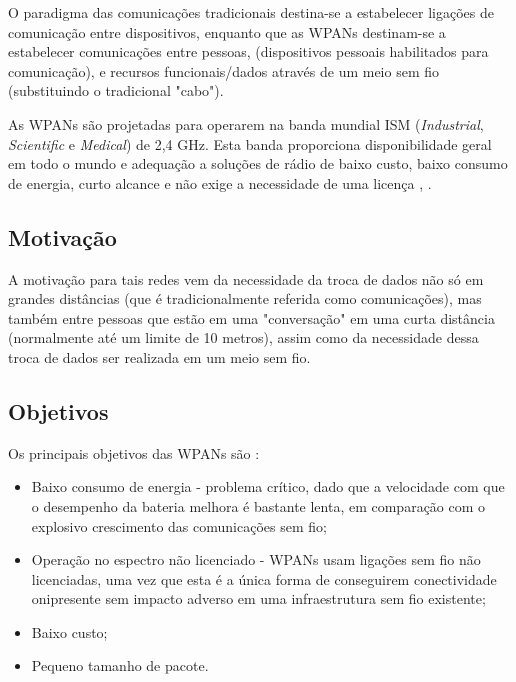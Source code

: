 \documentclass[conference]{IEEEtran}
\begin{document}
O paradigma das comunicações tradicionais destina-se a estabelecer ligações de comunicação entre dispositivos, enquanto que as WPANs destinam-se a estabelecer comunicações entre pessoas, (dispositivos pessoais habilitados para comunicação), e recursos funcionais/dados através de um meio sem fio (substituindo o tradicional "cabo").

As WPANs são projetadas para operarem na banda mundial ISM (\textit{Industrial}, \textit{Scientific} e \textit{Medical}) de 2,4 GHz. Esta banda proporciona disponibilidade geral em todo o mundo e adequação a soluções de rádio de baixo custo, baixo consumo de energia, curto alcance e não exige a necessidade de uma licença \cite{marsan2002optimizing}, \cite{braley2000wireless}.


\subsection{Motivação}

A motivação para tais redes vem da necessidade da troca de dados não só em grandes distâncias (que é tradicionalmente referida como comunicações), mas também entre pessoas que estão em uma "conversação" em uma curta distância (normalmente até um limite de 10 metros), assim como da necessidade dessa troca de dados ser realizada em um meio sem fio.


\subsection{Objetivos}

Os principais objetivos das WPANs são \cite{prasad2004ofdm}:

\begin{itemize}

 \item Baixo consumo de energia - problema crítico, dado que a velocidade com que o desempenho da bateria melhora é bastante lenta, em comparação com o explosivo crescimento das comunicações sem fio;
 \item Operação no espectro não licenciado - WPANs usam ligações sem fio não licenciadas, uma vez que esta é a única forma de conseguirem conectividade onipresente sem impacto adverso em uma infraestrutura sem fio existente;
 \item Baixo custo;
 \item Pequeno tamanho de pacote.
 
\end{itemize}
\end{document}
